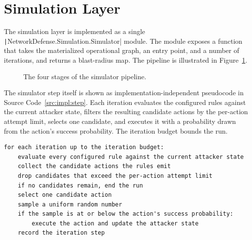 \section{Simulation Layer}

The simulation layer is implemented as a single \texttt|NetworkDefense.Simulation.Simulator| module. The module exposes a function that takes the materialized operational graph, an entry point, and a number of iterations, and returns a blast-radius map. The pipeline is illustrated in Figure~\ref{fig:impl:pipeline}.

\begin{figure}[hbt!]
	\centering
	\caption{The four stages of the simulator pipeline.}
	\label{fig:impl:pipeline}
\end{figure}

The simulator step itself is shown as implementation-independent pseudocode in Source Code~\ref{src:impl:step}. Each iteration evaluates the configured rules against the current attacker state, filters the resulting candidate actions by the per-action attempt limit, selects one candidate, and executes it with a probability drawn from the action's success probability. The iteration budget bounds the run.

\begin{code}
	\begin{verbatim}
for each iteration up to the iteration budget:
    evaluate every configured rule against the current attacker state
    collect the candidate actions the rules emit
    drop candidates that exceed the per-action attempt limit
    if no candidates remain, end the run
    select one candidate action
    sample a uniform random number
    if the sample is at or below the action's success probability:
        execute the action and update the attacker state
    record the iteration step
	\end{verbatim}
	\caption{Implementation-independent pseudocode: one Monte Carlo iteration.}
	\label{src:impl:step}
\end{code}

